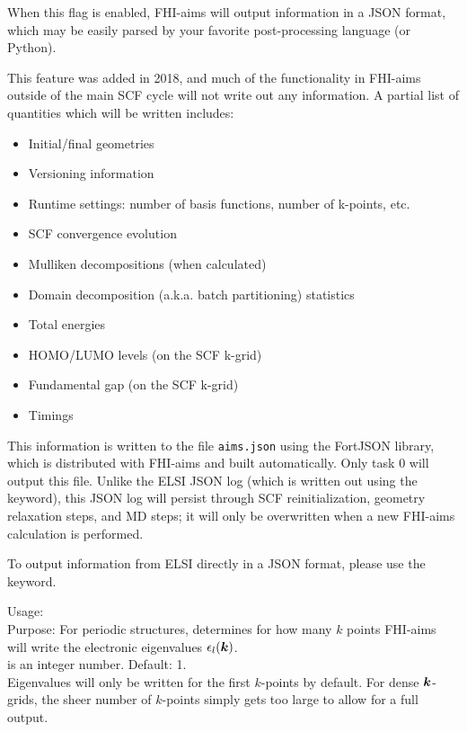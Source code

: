 When this flag is enabled, FHI-aims will output information in a JSON format,
which may be easily parsed by your favorite post-processing language (or Python).

This feature was added in 2018, and much of the functionality in FHI-aims
outside of the main SCF cycle will not write out any information.  A partial
list of quantities which will be written includes:
\begin{itemize}
  \item Initial/final geometries
  \item Versioning information
  \item Runtime settings: number of basis functions, number of k-points, etc.
  \item SCF convergence evolution
  \item Mulliken decompositions (when calculated)
  \item Domain decomposition (a.k.a. batch partitioning) statistics
  \item Total energies
  \item HOMO/LUMO levels (on the SCF k-grid)
  \item Fundamental gap (on the SCF k-grid)
  \item Timings
\end{itemize}

This information is written to the file \texttt{aims.json} using the FortJSON
library, which is distributed with FHI-aims and built automatically.  Only task
0 will output this file.  Unlike the ELSI JSON log (which is written out using
the   keyword), this JSON log will
persist through SCF reinitialization, geometry relaxation steps, and MD steps;
it will only be overwritten when a new FHI-aims calculation is performed.

To output information from ELSI directly in a JSON format, please use the
  keyword.

{
  \noindent
  Usage:  
   \\[1.0ex]
  Purpose: For periodic structures, determines for how many $k$ points
    FHI-aims will write the electronic eigenvalues
    $\epsilon_l(\mbox{\boldmath$k$})$. \\[1.0ex]
   is an integer number. Default: 1. \\
}
Eigenvalues will only be written for the first 
$k$-points by default. For dense $\mbox{\boldmath$k$}$-grids, the sheer number of
$k$-points simply gets too large to allow for a full output.

